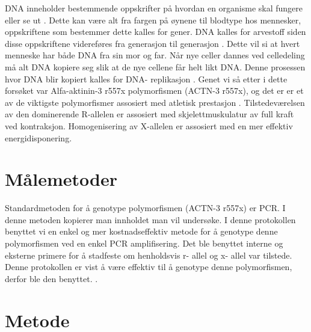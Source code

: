 \documentclass[
]{book}
\begin{document}
DNA inneholder bestemmende oppskrifter på hvordan en organisme skal fungere eller se ut \citet{martinsen2020}. Dette kan være alt fra fargen på øynene til blodtype hos mennesker, oppskriftene som bestemmer dette kalles for gener. DNA kalles for arvestoff siden disse oppskriftene videreføres fra generasjon til generasjon \citet{martinsen2020}. Dette vil si at hvert menneske har både DNA fra sin mor og far. Når nye celler dannes ved celledeling må alt DNA kopiere seg slik at de nye cellene får helt likt DNA. Denne prosessen hvor DNA blir kopiert kalles for DNA- replikasjon \citet{martinsen2020}. Genet vi så etter i dette forsøket var Alfa-aktinin-3 r557x polymorfismen (ACTN-3 r557x), og det er er et av de viktigste polymorfismer assosiert med atletisk prestasjon \citet{schadock2015} . Tilstedeværelsen av den dominerende R-allelen er assosiert med skjelettmuskulatur av full kraft ved kontraksjon. Homogenisering av X-allelen er assosiert med en mer effektiv energidisponering.

\hypertarget{muxe5lemetoder}{%
\section{Målemetoder}\label{muxe5lemetoder}}

Standardmetoden for å genotype polymorfismen (ACTN-3 r557x) er PCR. I denne metoden kopierer man innholdet man vil undersøke. I denne protokollen benyttet vi en enkel og mer kostnadseffektiv metode for å genotype denne polymorfismen ved en enkel PCR amplifisering. Det ble benyttet interne og eksterne primere for å stadfeste om henholdsvis r- allel og x- allel var tilstede. Denne protokollen er vist å være effektiv til å genotype denne polymorfismen, derfor ble den benyttet. \citet{schadock2015}.

\hypertarget{metode-3}{%
\section{Metode}\label{metode-3}}
\end{document}
